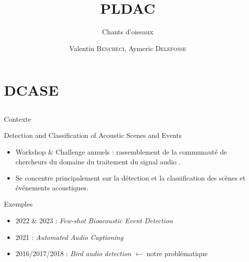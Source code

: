 \documentclass[compress,xcolor=table]{beamer}
\title{PLDAC}
\subtitle{Chants d'oiseaux} %
\date{\formatdate{25}{05}{2023}}
\author{Valentin \textsc{Bencheci}, Aymeric \textsc{Delefosse}}
\institute{Master DAC - Sorbonne Université} %
\begin{document}
\begin{frame}[plain]
    \titlepage
    \setcounter{framenumber}{0}
\end{frame}


\section{DCASE} \subsection{}

\begin{frame}{Contexte}

    \begin{block}{Detection and Classification of Acoustic Scenes and Events}

        \begin{itemize}
            \item
                  Workshop \& Challenge annuels : rassemblement de la communauté de chercheurs du domaine du traitement du signal audio .
            \item
                  Se concentre principalement sur la détection et la classification des scènes et événements acoustiques.
        \end{itemize}

    \end{block}

    \begin{exampleblock}{Exemples}
        \begin{itemize}
            \item
                  2022 \& 2023 : \textit{Few-shot Bioacoustic Event Detection}
            \item
                  2021 : \textit{Automated Audio Captioning}
            \item
                  2016/2017/2018 : \textit{Bird audio detection} $\leftarrow$ notre problématique
        \end{itemize}
    \end{exampleblock}

\end{frame}
\end{document}
